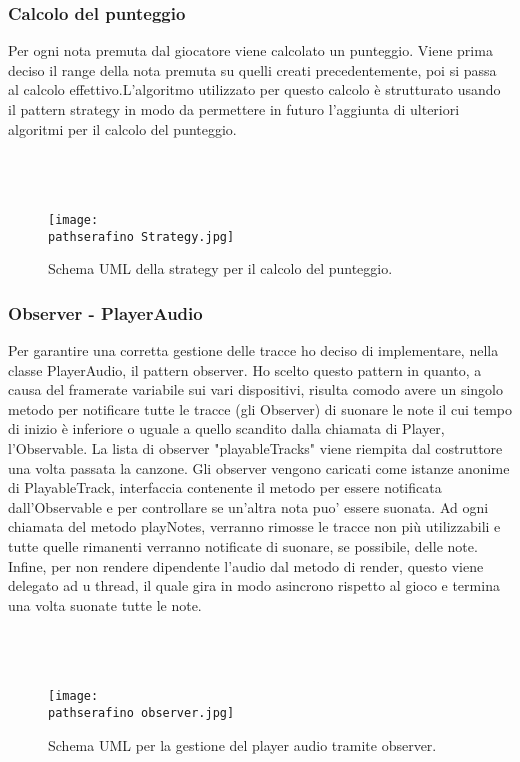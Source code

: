 \documentclass[a4paper,12pt]{report}
\newcommand\pathserafino{img/serafino/}
\begin{document}
\subsubsection{Calcolo del punteggio}
Per ogni nota premuta dal giocatore viene calcolato un punteggio. Viene prima deciso il range della nota premuta su quelli creati precedentemente, poi si passa al calcolo effettivo.L'algoritmo utilizzato per questo calcolo è strutturato usando il pattern strategy in modo da permettere in futuro l'aggiunta di ulteriori algoritmi per il calcolo del punteggio. \\ \\ \\ \\
\begin{figure}[!htb]
	\centerline{\texttt{[image: \\pathserafino Strategy.jpg]}}
	\caption{Schema UML della strategy per il calcolo del punteggio.}
	\label{img:calcpunteggio}
\end{figure}
\clearpage \hfill\break

\subsubsection{Observer - PlayerAudio}
Per garantire una corretta gestione delle tracce ho deciso di implementare, nella classe PlayerAudio, il pattern observer. Ho scelto questo pattern in quanto, a causa del framerate variabile sui vari dispositivi, risulta comodo avere un singolo metodo per notificare tutte le tracce (gli Observer) di suonare le note il cui tempo di inizio è inferiore o uguale a quello scandito dalla chiamata di Player, l'Observable.
La lista di observer "playableTracks" viene riempita dal costruttore una volta passata la canzone. Gli observer vengono caricati come istanze anonime di PlayableTrack, interfaccia contenente il metodo per essere notificata dall'Observable e per controllare se un'altra nota puo' essere suonata.
Ad ogni chiamata del metodo playNotes, verranno rimosse le tracce non più utilizzabili e tutte quelle rimanenti verranno notificate di suonare, se possibile, delle note.
Infine, per non rendere dipendente l'audio dal metodo di render, questo viene delegato ad u thread, il quale gira in modo asincrono rispetto al gioco e termina una volta suonate tutte le note.
 \\ \\ \\ \\
\begin{figure}[!htb]
	\centerline{\texttt{[image: \\pathserafino observer.jpg]}}
	\caption{Schema UML per la gestione del player audio tramite observer.}
	\label{img:observer}
\end{figure}
\clearpage \hfill\break
\end{document}
